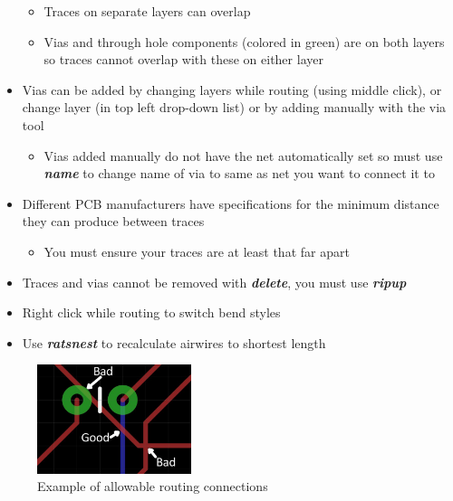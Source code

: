 \documentclass{article}
\begin{document}
\begin{itemize}
\begin{itemize}
        \item Traces on separate layers can overlap
        \item Vias and through hole components (colored in green) are on both layers so traces cannot overlap with these on either layer
    \end{itemize}
    \item Vias can be added by changing layers while routing (using middle click), or change layer (in top left drop-down list) or by adding manually with the via tool
    \begin{itemize}
        \item Vias added manually do not have the net automatically set so must use \textit{\textbf{name}} to change name of via to same as net you want to connect it to
    \end{itemize}
    \item Different PCB manufacturers have specifications for the minimum distance they can produce between traces
    \begin{itemize}
        \item You must ensure your traces are at least that far apart
    \end{itemize}
    \item Traces and vias cannot be removed with \textit{\textbf{delete}}, you must use \textit{\textbf{ripup}}
\end{itemize}
\begin{tcolorbox} [title=Tips \& Tricks]
    \begin{itemize}
        \item Right click while routing to switch bend styles
        \item Use \textit{\textbf{ratsnest}} to recalculate airwires to shortest
        length
    \end{itemize}
\end{tcolorbox}

\begin{figure}[!h]
    \center
    \includegraphics[width=0.4\textwidth,height=0.4\textheight,keepaspectratio]{routing}
    \caption {Example of allowable routing connections}
    \label{img:routing}
\end{figure}
\end{document}
